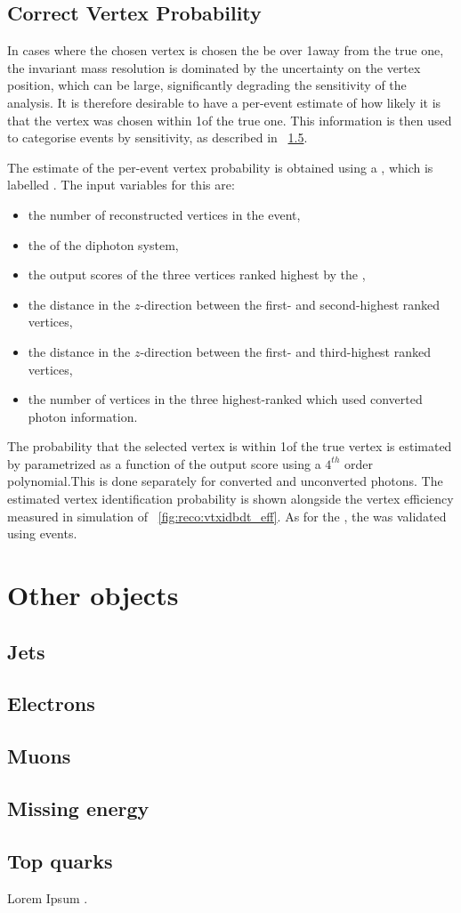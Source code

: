 \subsection{Correct Vertex Probability}

In cases where the chosen vertex is chosen the be over 1\cm away from the true one, the invariant mass resolution is dominated by the uncertainty on the vertex position, which can be large, significantly degrading the sensitivity of the analysis. It is therefore desirable to have a per-event estimate of how likely it is that the vertex was chosen within 1\cm of the true one. This information is then used to categorise events by sensitivity, as described in \Sec~\ref{}.

The estimate of the per-event vertex probability is obtained using a \BDT, which is labelled \VtxProbBdt. The input variables for this \BDT are:

\begin{itemize}
\item the number of reconstructed vertices in the event,
\item the \pT of the diphoton system,
\item the output scores of the three vertices ranked highest by the \VtxIdBdt,
\item the distance in the $z$-direction between the first- and second-highest ranked vertices,
\item the distance in the $z$-direction between the first- and third-highest ranked vertices,
\item the number of vertices in the three highest-ranked which used converted photon information.
\end{itemize}

The probability that the selected vertex is within 1\cm of the true vertex is estimated by parametrized as a function of the \VtxProbBdt output score using a $4^{th}$ order polynomial.This is done separately for converted and unconverted photons. The estimated vertex identification probability is shown alongside the vertex efficiency measured in simulation of \Fig~\ref{fig:reco:vtxidbdt_eff}. As for the \VtxIdBdt, the \VtxProbBdt was validated using \Zmumu events. 

\section{Other objects} 
\label{reco:sec:other}
\subsection{Jets}
\subsection{Electrons}
\subsection{Muons}
\subsection{Missing energy}
\subsection{Top quarks}

Lorem Ipsum \cite{PDGBooklet}.
